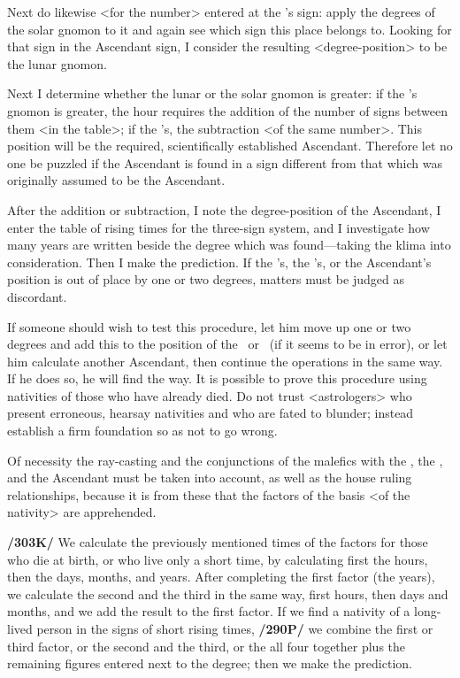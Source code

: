 Next do likewise <for the number> entered at the \Moon’s sign: apply the degrees of the solar gnomon to it and again see which sign this place belongs to. Looking for that sign in the Ascendant sign, I
consider the resulting <degree-position> to be the lunar gnomon. 

Next I determine whether the lunar or the solar gnomon is greater: if the \Sun’s gnomon is greater, the hour requires the addition of the number of signs between them <in the table>; if the \Moon’s, the
subtraction <of the same number>. This position will be the required, scientifically established Ascendant. Therefore let no one be puzzled if the Ascendant is found in a sign different from that which was originally assumed to be the Ascendant. 

After the addition or subtraction, I note the degree-position of the
Ascendant, I enter the table of rising times for the three-sign system, and I investigate how many years are written beside the degree which was found—taking the klima into consideration. Then I make the
prediction. If the \Sun’s, the \Moon’s, or the Ascendant’s position is out of place by one or two degrees, matters must be judged as discordant.

If someone should wish to test this procedure, let him move up one or two degrees and add this to the position of the \Sun\, or \Moon\, (if it seems to be in error), or let him calculate another Ascendant, then
continue the operations in the same way. If he does so, he will find the way. It is possible to prove this procedure using nativities of those who have already died. Do not trust <astrologers> who present
erroneous, hearsay nativities and who are fated to blunder; instead establish a firm foundation so as not to go wrong.

Of  necessity the ray-casting and the conjunctions of the malefics with the \Sun, the \Moon, and the Ascendant must be taken into account, as well as the house ruling relationships, because it is from these
that the factors of the basis <of the nativity> are apprehended.

\textbf{/303K/} We calculate the previously mentioned times of the factors for those who die at birth, or who live only a short time, by calculating first the hours, then the days, months, and years. After completing the first factor (the years), we calculate the second and the third in the same way, first hours, then days and months, and we add the result to the first factor. If we find a nativity of a long-lived person in the signs of short rising times, \textbf{/290P/} we combine the first or third factor, or the second and the third, or the all four together plus the remaining figures entered next to the degree; then we make the prediction.

